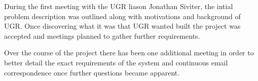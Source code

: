 During the first meeting with the UGR liason Jonathan Siviter, the intial problem description was outlined along with motivations and background of UGR. Once discovering what it was that UGR wanted built the project was accepted and meetings planned to gather further requirements. 


Over the course of the project there has been one additional meeting in order to better detail the exact requirements of the system and continuous email correspondence once further questions became apparent.

